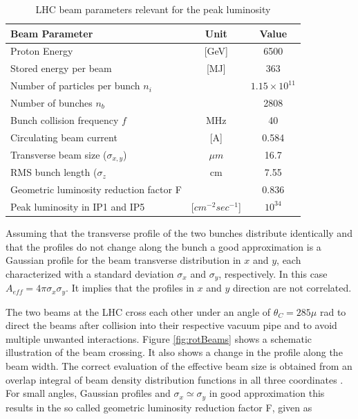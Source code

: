 \begin{table}[htp]
\begin{center}
\begin{tabular}{|l|c|c|}
\hline
{\bf Beam Parameter} & {\bf Unit} & {\bf Value} \\ \hline
Proton Energy & [GeV] & 6500 \\ \hline
Stored energy per beam & [MJ] & 363 \\ \hline
Number of particles per bunch $n_{i}$ & & $1.15 \times 10^{11}$ \\ \hline
Number of bunches $n_{b}$ & & 2808 \\ \hline
Bunch collision frequency $f$ & MHz & 40 \\ \hline
Circulating beam current & [A] & 0.584 \\ \hline
Transverse beam size ($\sigma_{x,y}$) & $\mu m$ & 16.7 \\ \hline
RMS bunch length ($\sigma_{z}$ & cm & 7.55 \\ \hline
Geometric luminosity reduction factor F & & 0.836 \\ \hline
Peak luminosity in IP1 and IP5 & [$cm^{-2} sec^{-1}$] & $10^{34}$ \\ \hline \hline

\end{tabular}
\end{center}
    \captionsetup{format=hang}
     \caption{LHC beam parameters relevant for the peak luminosity \cite{fill-schemes}}
    \label{tbl:beamParam}
\end{table}%


Assuming that the transverse profile of the two bunches distribute identically and that the profiles do not change along the bunch a good approximation is a Gaussian profile for the beam transverse distribution in $x$ and $y$, each characterized with a standard deviation $\sigma_{x}$ and $\sigma_{y}$, respectively. In this case $A_{eff} = 4 \pi \sigma_{x} \sigma_{y}$. It implies that the profiles in $x$ and $y$ direction are not correlated.


The two beams at the LHC cross each other under an angle of $\theta_{C} = 285 \mu $ rad to direct the beams after collision into their respective vacuum pipe and to avoid multiple unwanted interactions. Figure \ref{fig:rotBeams} shows a schematic illustration of the beam crossing. It also shows a change in the profile along the beam width. The correct evaluation of the effective beam size is obtained from an overlap integral of beam density distribution functions in all three coordinates \cite{lumiConcepts}. For small angles, Gaussian profiles and $\sigma_{x} \simeq \sigma_{y}$ in good approximation this results in the so called geometric luminosity reduction factor F, given as


